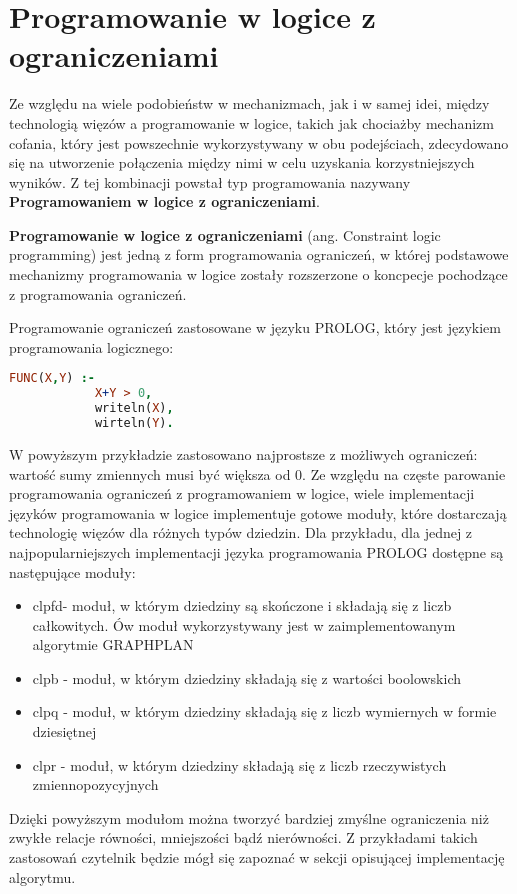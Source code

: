 \section{Programowanie w logice z ograniczeniami}
    Ze względu na wiele podobieństw w mechanizmach, jak i w samej idei, między technologią więzów a programowanie w logice, takich jak chociażby mechanizm cofania, który jest 
    powszechnie wykorzystywany w obu podejściach, zdecydowano się na utworzenie połączenia między nimi w celu uzyskania korzystniejszych wyników. Z tej kombinacji powstał 
    typ programowania nazywany \textbf{Programowaniem w logice z ograniczeniami}.
    \begin{definition}
        \textbf{Programowanie w logice z ograniczeniami} (ang. Constraint logic programming) jest jedną z form programowania ograniczeń,
        w której podstawowe mechanizmy programowania w logice zostały rozszerzone o koncpecje pochodzące z programowania ograniczeń.
    \end{definition}

    \begin{example}
        Programowanie ograniczeń zastosowane w języku PROLOG, który jest językiem programowania logicznego:
        
        \begin{lstlisting}[language=PROLOG, caption=Funkcja wypisująca liczby gdy ich suma jest większa od 0]
            FUNC(X,Y) :-
            X+Y > 0,
            writeln(X),
            wirteln(Y).
        \end{lstlisting}
    \end{example}
    W powyższym przykładzie zastosowano najprostsze z możliwych ograniczeń: wartość sumy zmiennych musi być większa od 0. 
    Ze względu na częste parowanie programowania ograniczeń z programowaniem w logice, wiele implementacji języków programowania w 
    logice implementuje gotowe moduły, które dostarczają technologię więzów dla różnych typów dziedzin. Dla przykładu, dla 
    jednej z najpopularniejszych implementacji języka programowania PROLOG dostępne są następujące moduły:
    \begin{itemize}
        \item clpfd- moduł, w którym dziedziny są skończone i składają się z liczb całkowitych. Ów moduł 
        wykorzystywany jest w zaimplementowanym algorytmie GRAPHPLAN
        \item clpb - moduł, w którym dziedziny składają się z wartości boolowskich
        \item clpq - moduł, w którym dziedziny składają się z liczb wymiernych w formie dziesiętnej
        \item clpr - moduł, w którym dziedziny składają się z liczb rzeczywistych zmiennopozycyjnych 
    \end{itemize}
    Dzięki powyższym modułom można tworzyć bardziej zmyślne ograniczenia niż zwykłe relacje równości, mniejszości bądź nierówności. Z przykładami takich zastosowań
    czytelnik będzie mógł się zapoznać w sekcji opisującej implementację algorytmu.

